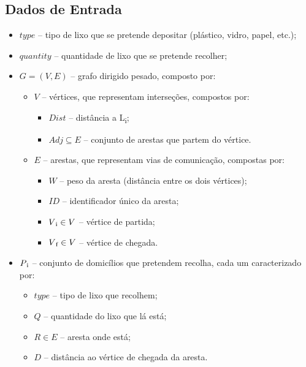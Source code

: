 \documentclass[article, a4paper, 12pt, oneside]{memoir}
\begin{document}
\subsection{Dados de Entrada}

\begin{itemize} %

\item $type$ – tipo de lixo que se pretende depositar (plástico, vidro, papel, etc.);
\item $quantity$ – quantidade de lixo que se pretende recolher;
\item $G = (V, E)$ – grafo dirigido pesado, composto por:

	\begin{itemize} %

	\item $V$ – vértices, que representam interseções, compostos por:

		\begin{itemize} %
		\item $Dist$ – distância a L\textsubscript{i};
		\item $Adj \subseteq E$ – conjunto de arestas que partem do vértice.
		\end{itemize} %

	\end{itemize} %

	\begin{itemize} %

	\item $E$ – arestas, que representam vias de comunicação, compostas por:

		\begin{itemize} %
		\item $W$ – peso da aresta (distância entre os dois vértices);
		\item $ID$ – identificador único da aresta;
		\item $V\textsubscript{i} \in V$ – vértice de partida;
		\item $V\textsubscript{f} \in V$ – vértice de chegada.
		\end{itemize} %

	\end{itemize} %

\item $P\textsubscript{i}$ – conjunto de domicílios que pretendem recolha, cada um caracterizado por:

	\begin{itemize} %

	\item $type$ – tipo de lixo que recolhem;
	\item $Q$ – quantidade do lixo que lá está;
	\item $R \in E$ – aresta onde está;
	\item $D$ – distância ao vértice de chegada da aresta.


\end{itemize}
\end{itemize}
\end{document}
